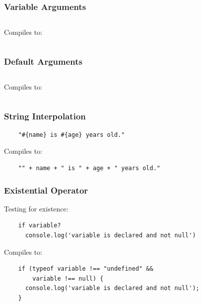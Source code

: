 \documentclass{beamer}
\begin{document}
\begin{frame}
  \frametitle{Variable Arguments}

  \inputminted{coffeescript}{src/vararg.coffee}

  \pause
  \vspace{.5cm}
  Compiles to:
  \vspace{.5cm}

  \inputminted[fontsize=\tiny]{coffeescript}{src/vararg.js}
  
\end{frame}

\begin{frame}
\frametitle{Default  Arguments}

  \inputminted{coffeescript}{src/defvalues.coffee}

  \pause
  \vspace{.5cm}
  Compiles to:
  \vspace{.5cm}

  \inputminted[fontsize=\small]{coffeescript}{src/defvalues.js}


\end{frame}

\begin{frame}[fragile]
  \frametitle{String Interpolation}
 
  \begin{verbatim}
    "#{name} is #{age} years old."
  \end{verbatim}

  \pause
  \vspace{.5cm}
  Compiles to:
  \vspace{.5cm}

  \begin{verbatim}
    "" + name + " is " + age + " years old."
  \end{verbatim}  
\end{frame}

%
%
 \begin{frame}[fragile]
  \frametitle{Existential Operator}

  Testing for existence:

  \begin{verbatim}
    if variable?
      console.log('variable is declared and not null')
  \end{verbatim}

  \pause
  \vspace{.5cm}
  Compiles to:
  \vspace{.5cm}


  \begin{verbatim}
    if (typeof variable !== "undefined" && 
        variable !== null) {
      console.log('variable is declared and not null');
    }
  \end{verbatim}  
\end{frame}
\end{document}

